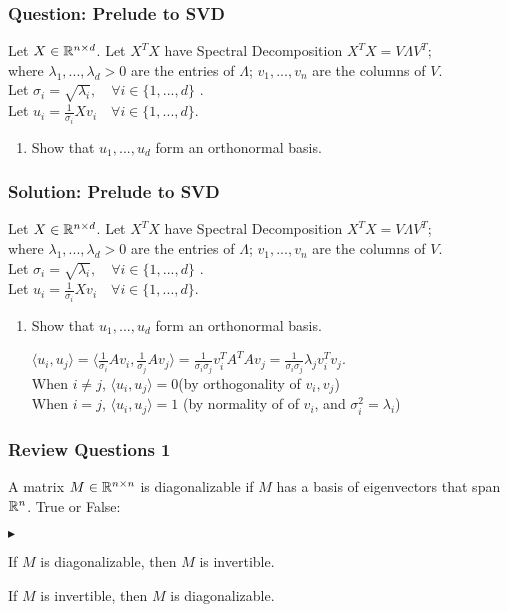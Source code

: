 \documentclass{beamer}
\renewenvironment{itemize}
\renewenvironment{enumerate}%
{\begin{list}{\arabic{enumi}.}%
      {\setlength{\leftmargin}{2.5em}%
       \setlength{\itemsep}{-\parsep}%
       \setlength{\topsep}{-\parskip}%
       \usecounter{enumi}}%
 }{\end{list}}
\renewenvironment{itemize}%
{\begin{list}{$\blacktriangleright$}%
      {\setlength{\leftmargin}{2.5em}%
       \setlength{\itemsep}{-\parsep}%
       \setlength{\topsep}{-\parskip}%
       \usecounter{enumi}}%
 }{\end{list}}
\begin{document}
\begin{frame}
\frametitle{Question: Prelude to SVD}
Let $X \in \mathbb{R}^{n\times d}$. Let $X^TX$ have Spectral Decomposition $X^TX = V\Lambda V^T$;\\
where $\lambda_1,...,\lambda_d > 0$ are the entries of $\Lambda$; $v_1,...,v_n$ are the columns of $V$.\\ 
\medskip
Let $\sigma_i = \sqrt{\lambda_i},\quad \forall i\in \{1,...,d\}$ .\\
Let $u_i = \frac{1}{\sigma_i} Xv_i\quad \forall i\in \{1,...,d\}.$

\begin{enumerate}
\item Show that $u_1,...,u_d$ form an orthonormal basis.
\end{enumerate}
\end{frame}

\begin{frame}
\frametitle{Solution: Prelude to SVD}
Let $X \in \mathbb{R}^{n\times d}$. Let $X^TX$ have Spectral Decomposition $X^TX = V\Lambda V^T$;\\
where $\lambda_1,...,\lambda_d > 0$ are the entries of $\Lambda$; $v_1,...,v_n$ are the columns of $V$.\\ 
\medskip
Let $\sigma_i = \sqrt{\lambda_i},\quad \forall i\in \{1,...,d\}$ .\\
Let $u_i = \frac{1}{\sigma_i} Xv_i\quad \forall i\in \{1,...,d\}.$

\begin{enumerate}
\item Show that $u_1,...,u_d$ form an orthonormal basis.
\begin{solution}
$\langle u_i,u_j \rangle = \langle \frac{1}{\sigma_i}Av_i,\frac{1}{\sigma_j}Av_j \rangle = \frac{1}{\sigma_i\sigma_j}v_i^TA^TAv_j =  \frac{1}{\sigma_ i\sigma_j} \lambda_j v_i^Tv_j$.\\
When $i \neq j$, $\langle u_i,u_j \rangle = 0$\quad (by orthogonality of $v_i,v_j$)\\
When $i = j$, $\langle u_i,u_j \rangle = 1$ \quad (by normality of of $v_i$, and $\sigma_i^2 = \lambda_i$)
\end{solution}
\end{enumerate}
\end{frame}



\begin{frame}
\frametitle{Review Questions 1}
A matrix $M\in \mathbb{R}^{n\times n}$ is diagonalizable if $M$ has a basis of eigenvectors that span $\mathbb{R}^n$.
True or False:
\begin{itemize}
\item If $M$ is diagonalizable, then $M$ is invertible.
\item If $M$ is invertible, then $M$ is diagonalizable.
\end{itemize}
\end{frame}
\end{document}

